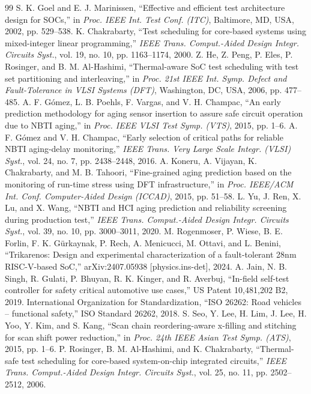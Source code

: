 \documentclass[journal]{IEEEtran}
\begin{document}
\begin{thebibliography}{99}
 S. K. Goel and E. J. Marinissen, ``Effective and efficient test architecture design for SOCs,'' in \emph{Proc. IEEE Int. Test Conf. (ITC)}, Baltimore, MD, USA, 2002, pp. 529--538.
 K. Chakrabarty, ``Test scheduling for core-based systems using mixed-integer linear programming,'' \emph{IEEE Trans. Comput.-Aided Design Integr. Circuits Syst.}, vol. 19, no. 10, pp. 1163--1174, 2000.
 Z. He, Z. Peng, P. Eles, P. Rosinger, and B. M. Al-Hashimi, ``Thermal-aware SoC test scheduling with test set partitioning and interleaving,'' in \emph{Proc. 21st IEEE Int. Symp. Defect and Fault-Tolerance in VLSI Systems (DFT)}, Washington, DC, USA, 2006, pp. 477--485.
 A. F. G\'omez, L. B. Poehls, F. Vargas, and V. H. Champac, ``An early prediction methodology for aging sensor insertion to assure safe circuit operation due to NBTI aging,'' in \emph{Proc. IEEE VLSI Test Symp. (VTS)}, 2015, pp. 1--6.
 A. F. G\'omez and V. H. Champac, ``Early selection of critical paths for reliable NBTI aging-delay monitoring,'' \emph{IEEE Trans. Very Large Scale Integr. (VLSI) Syst.}, vol. 24, no. 7, pp. 2438--2448, 2016.
 A. Koneru, A. Vijayan, K. Chakrabarty, and M. B. Tahoori, ``Fine-grained aging prediction based on the monitoring of run-time stress using DFT infrastructure,'' in \emph{Proc. IEEE/ACM Int. Conf. Computer-Aided Design (ICCAD)}, 2015, pp. 51--58.
 L. Yu, J. Ren, X. Lu, and X. Wang, ``NBTI and HCI aging prediction and reliability screening during production test,'' \emph{IEEE Trans. Comput.-Aided Design Integr. Circuits Syst.}, vol. 39, no. 10, pp. 3000--3011, 2020.
 M. Rogenmoser, P. Wiese, B. E. Forlin, F. K. G\"urkaynak, P. Rech, A. Menicucci, M. Ottavi, and L. Benini, ``Trikarenos: Design and experimental characterization of a fault-tolerant 28nm RISC-V-based SoC,'' arXiv:2407.05938 [physics.ins-det], 2024.
 A. Jain, N. B. Singh, R. Gulati, P. Bhuyan, R. K. Kinger, and R. Averbuj, ``In-field self-test controller for safety critical automotive use cases,'' US Patent 10,481,202 B2, 2019.
 International Organization for Standardization, ``ISO 26262: Road vehicles -- functional safety,'' ISO Standard 26262, 2018.
 S. Seo, Y. Lee, H. Lim, J. Lee, H. Yoo, Y. Kim, and S. Kang, ``Scan chain reordering-aware x-filling and stitching for scan shift power reduction,'' in \emph{Proc. 24th IEEE Asian Test Symp. (ATS)}, 2015, pp. 1--6.
 P. Rosinger, B. M. Al-Hashimi, and K. Chakrabarty, ``Thermal-safe test scheduling for core-based system-on-chip integrated circuits,'' \emph{IEEE Trans. Comput.-Aided Design Integr. Circuits Syst.}, vol. 25, no. 11, pp. 2502--2512, 2006.

\end{thebibliography}
\end{document}

